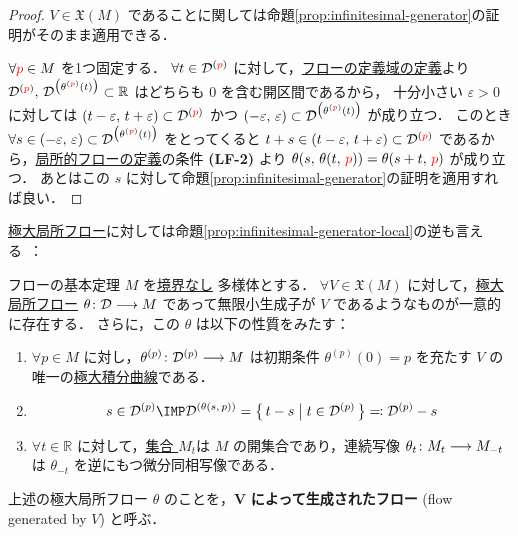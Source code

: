 \documentclass[TQFT_main]{subfiles}
\begin{document}
\begin{proof}
    $V \in \mathfrak{X}(M)$ であることに関しては命題\ref{prop:infinitesimal-generator}の証明がそのまま適用できる．

    $\forall \textcolor{red}{p} \in M$ を1つ固定する． 
    $\forall t \in \mathcal{D}^{(\textcolor{red}{p})}$ に対して，\hyperref[def:local-flow]{フローの定義域の定義}より $\mathcal{D}^{(\textcolor{red}{p})},\, \mathcal{D}^{\bigl(\theta^{(\textcolor{red}{p})}(t)\bigr)} \subset \mathbb{R}$ はどちらも $0$ を含む開区間であるから，
    十分小さい $\varepsilon > 0$ に対しては $(t - \varepsilon,\, t + \varepsilon) \subset \mathcal{D}^{(\textcolor{red}{p})}$ かつ $(-\varepsilon,\, \varepsilon) \subset \mathcal{D}^{\bigl(\theta^{(\textcolor{red}{p})}(t)\bigr)}$ が成り立つ．
    このとき $\forall s \in (-\varepsilon,\, \varepsilon) \subset \mathcal{D}^{\bigl(\theta^{(\textcolor{red}{p})}(t)\bigr)}$ をとってくると $t + s \in (t - \varepsilon,\, t + \varepsilon) \subset \mathcal{D}^{(\textcolor{red}{p})}$ であるから，\hyperref[def:local-flow]{局所的フローの定義}の条件 \textbf{\textsf{(LF-2)}} より $\theta(s,\, \theta(t,\, \textcolor{red}{p})) = \theta(s+t,\, \textcolor{red}{p})$ が成り立つ．
    あとはこの $s$ に対して命題\ref{prop:infinitesimal-generator}の証明を適用すれば良い．
\end{proof}

\hyperref[def:local-flow]{極大局所フロー}に対しては命題\ref{prop:infinitesimal-generator-local}の逆も言える~\cite[p.212, Theorem 9.12]{Lee2012smooth}：

\begin{mytheo}[label=thm:fundamental-flow,breakable]{フローの基本定理}
    $M$ を\underline{境界なし} \cinfty 多様体とする．
    $\forall V \in \mathfrak{X}(M)$ に対して，\hyperref[def:local-flow]{極大局所フロー} $\theta \colon \mathcal{D} \longrightarrow M$ であって無限小生成子が $V$ であるようなものが一意的に存在する．
    さらに，この $\theta$ は以下の性質をみたす：
    \begin{enumerate}
        \item $\forall p \in M$ に対し，$\theta^{(p)} \colon \mathcal{D}^{(p)} \longrightarrow M$ は初期条件 $\theta^{(p)}(0) = p$ を充たす $V$ の唯一の\hyperref[def:local-flow]{極大積分曲線}である．
        \item 
        \begin{align}
            s \in \mathcal{D}^{(p)} \IMP \mathcal{D}^{(\theta(s,\, p))} = \bigl\{\, t - s \bigm| t \in \mathcal{D}^{(p)} \,\bigr\} \eqqcolon \mathcal{D}^{(p)} - s
        \end{align}
        \item $\forall t \in \mathbb{R}$ に対して，\hyperref[def:local-flow]{集合 $M_t$}は $M$ の開集合であり，連続写像 $\theta_t \colon M_t \longrightarrow M_{-t}$ は $\theta_{-t}$ を逆にもつ微分同相写像である．
    \end{enumerate}
    \tcblower
    上述の極大局所フロー $\theta$ のことを，$\bm{V}$ \textbf{によって生成されたフロー} (flow generated by $V$) と呼ぶ．
\end{mytheo}
\end{document}
